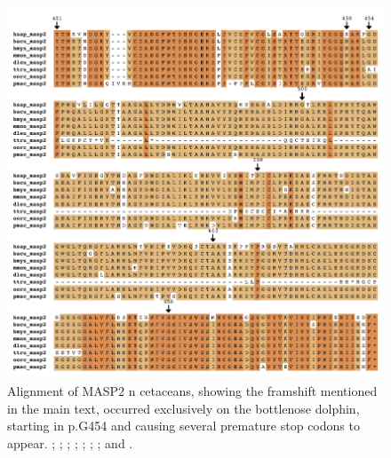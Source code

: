 \begin{figure}
    \begin{center}
        \includegraphics[width=\textwidth]{figures/a_masp2_whole.pdf}
        \caption[Alignment of MASP2 in cetaceans]{Alignment of MASP2 n cetaceans, showing the framshift mentioned in the main text, occurred exclusively on the bottlenose dolphin, starting in {p.G454} and causing several premature stop codons to appear. \hsap; \bacu; \bmys; \mmon; \dleu; \ttru; \oorc; and \pmac.}
        \label{app_f_masp12_align}
    \end{center}
\end{figure}

